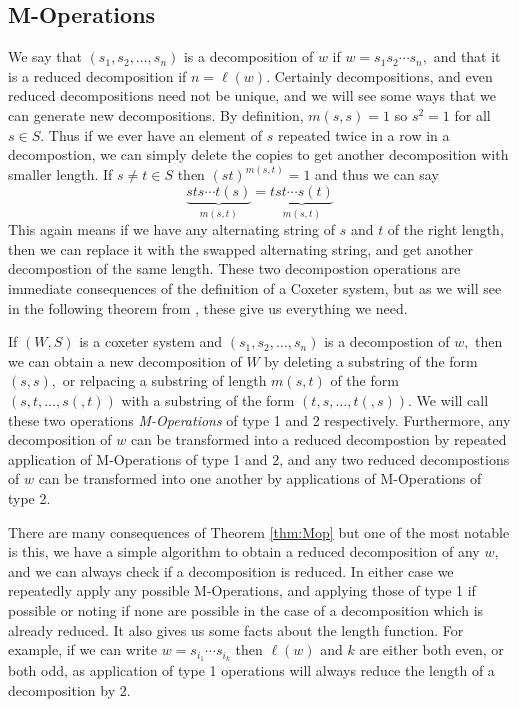 \documentclass[class=book, crop=false,12 pt]{standalone}
\begin{document}
\subsection{M-Operations}
We say that $(s_1,s_2,\dots,s_n)$ is a decomposition of $w$ if $w=s_1s_2\cdots s_n,$ and that it is a reduced decomposition if $n=\ell(w).$ Certainly decompositions, and even reduced decompositions need not be unique, and we will see some ways that we can generate new decompositions. By definition, $m(s,s)=1$ so $s^2=1$ for all $s\in S.$ Thus if we ever have an element of $s$ repeated twice in a row in a decompostion, we can simply delete the copies to get another decomposition with smaller length. If $s\neq t\in S$ then $(st)^{m(s,t)}=1$ and thus we can say
\[
	\underbrace{sts\cdots t(s)}_{m(s,t)}=\underbrace{tst\cdots s(t)}_{m(s,t)}
\]
This again means if we have any alternating string of $s$ and $t$ of the right length, then we can replace it with the swapped alternating string, and get another decompostion of the same length. These two decompostion operations are immediate consequences of the definition of a Coxeter system, but as we will see in the following theorem from \cite{buildings}, these give us everything we need.

\begin{theorem}
	\label{thm:Mop}
	If $(W,S)$ is a coxeter system and $(s_1,s_2,\dots,s_n)$ is a decompostion of $w,$ then we can obtain a new decomposition of $W$ by deleting a substring of the form $(s,s),$ or relpacing a substring of length $m(s,t)$ of the form $(s,t,\dots,s(,t))$ with a substring of the form $(t,s,\dots,t(,s)).$ We will call these two operations \emph{M-Operations} of type 1 and 2 respectively. Furthermore, any decomposition of $w$ can be transformed into a reduced decompostion by repeated application of M-Operations of type 1 and 2, and any two reduced decompostions of $w$ can be transformed into one another by applications of M-Operations of type 2.
\end{theorem}

There are many consequences of Theorem \ref{thm:Mop} but one of the most notable is this, we have a simple algorithm to obtain a reduced decomposition of any $w,$ and we can always check if a decomposition is reduced. In either case we repeatedly apply any possible M-Operations, and applying those of type 1 if possible or noting if none are possible in the case of a decomposition which is already reduced. It also gives us some facts about the length function. For example, if we can write $w=s_{i_1}\cdots s_{i_k}$ then $\ell(w)$ and $k$ are either both even, or both odd, as application of type 1 operations will always reduce the length of a decomposition by 2.
\end{document}
